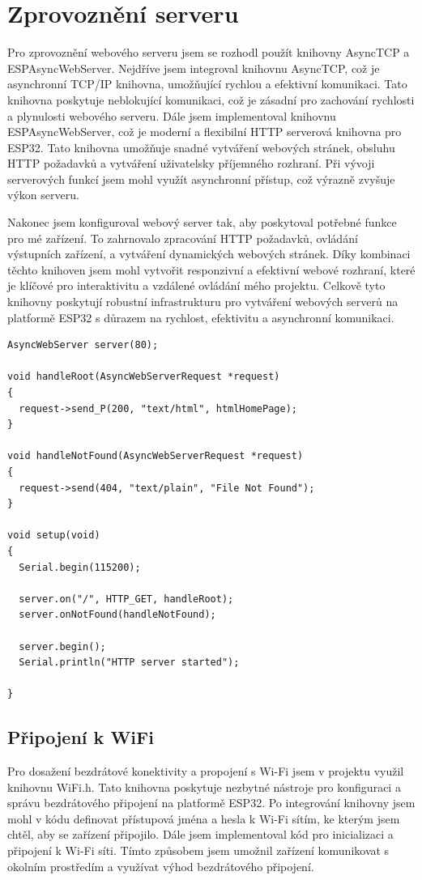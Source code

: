 \documentclass[12pt, a4paper,
oneside
openany
]{report}
\begin{document}
\newpage
\section{Zprovoznění serveru}
\noindent Pro zprovoznění webového serveru jsem se rozhodl použít knihovny AsyncTCP a ESPAsyncWebServer. Nejdříve jsem integroval knihovnu AsyncTCP, což je asynchronní TCP/IP knihovna, umožňující rychlou a efektivní komunikaci. Tato knihovna poskytuje neblokující komunikaci, což je zásadní pro zachování rychlosti a plynulosti webového serveru.
Dále jsem implementoval knihovnu ESPAsyncWebServer, což je moderní a flexibilní HTTP serverová knihovna pro ESP32. Tato knihovna umožňuje snadné vytváření webových stránek, obsluhu HTTP požadavků a vytváření uživatelsky příjemného rozhraní. Při vývoji serverových funkcí jsem mohl využít asynchronní přístup, což výrazně zvyšuje výkon serveru.

\noindent Nakonec jsem konfiguroval webový server tak, aby poskytoval potřebné funkce pro mé zařízení. To zahrnovalo zpracování HTTP požadavků, ovládání výstupních zařízení, a vytváření dynamických webových stránek. Díky kombinaci těchto knihoven jsem mohl vytvořit responzivní a efektivní webové rozhraní, které je klíčové pro interaktivitu a vzdálené ovládání mého projektu. Celkově tyto knihovny poskytují robustní infrastrukturu pro vytváření webových serverů na platformě ESP32 s důrazem na rychlost, efektivitu a asynchronní komunikaci.

\newpage
 \begin{lstlisting}[style=arduinoStyle]
AsyncWebServer server(80);

void handleRoot(AsyncWebServerRequest *request)
{
  request->send_P(200, "text/html", htmlHomePage);
}

void handleNotFound(AsyncWebServerRequest *request)
{
  request->send(404, "text/plain", "File Not Found");
}

void setup(void)
{
  Serial.begin(115200);

  server.on("/", HTTP_GET, handleRoot);
  server.onNotFound(handleNotFound);

  server.begin();
  Serial.println("HTTP server started");

}
\end{lstlisting}

 \newpage
 
\subsection{Připojení k WiFi}
\noindent Pro dosažení bezdrátové konektivity a propojení s Wi-Fi jsem v projektu využil knihovnu WiFi.h. Tato knihovna poskytuje nezbytné nástroje pro konfiguraci a správu bezdrátového připojení na platformě ESP32. Po integrování knihovny jsem mohl v kódu definovat přístupová jména a hesla k Wi-Fi sítím, ke kterým jsem chtěl, aby se zařízení připojilo. Dále jsem implementoval kód pro inicializaci a připojení k Wi-Fi síti. Tímto způsobem jsem umožnil zařízení komunikovat s okolním prostředím a využívat výhod bezdrátového připojení. 
\end{document}

